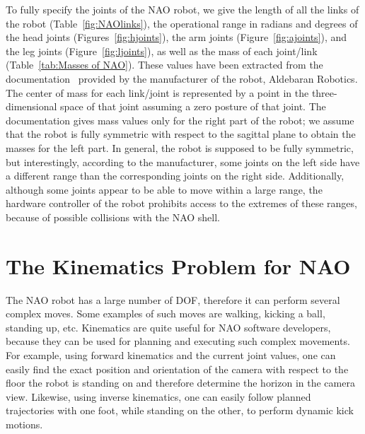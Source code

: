 To fully specify the joints of the NAO robot, we give the length of all the links of the robot (Table~\ref{fig:NAOlinks}), the operational range in radians and degrees of the head joints (Figures~\ref{fig:hjoints}), the arm joints (Figure~\ref{fig:ajoints}), and the leg joints (Figure~\ref{fig:ljoints}), as well as the mass of each joint/link (Table~\ref{tab:Masses of NAO}). These values have been extracted from the documentation~\cite{AldebaranNaoDoc} provided by the manufacturer of the robot, Aldebaran Robotics. The center of mass for each link/joint is represented by a point in the three-dimensional space of that joint assuming a zero posture of that joint. The documentation gives mass values only for the right part of the robot; we assume that the robot is fully symmetric with respect to the sagittal plane to obtain the masses for the left part. In general, the robot is supposed to be fully symmetric, but interestingly, according to the manufacturer, some joints on the left side have a different range than the corresponding joints on the right side. Additionally, although some joints appear to be able to move within a large range, the hardware controller of the robot prohibits access to the extremes of these ranges, because of possible collisions with the NAO shell.

\section{The Kinematics Problem for NAO}
The NAO robot has a large number of DOF, therefore it can perform several complex moves. Some examples of such moves are walking, kicking a ball, standing up, etc.  Kinematics are quite useful for NAO software developers, because they can be used for planning and executing such complex movements. For example, using forward kinematics and the current joint values, one can easily find the exact position and orientation of the camera with respect to the floor the robot is standing on and therefore determine the horizon in the camera view. Likewise, using inverse kinematics, one can easily follow planned trajectories with one foot, while standing on the other, to perform dynamic kick motions. 



